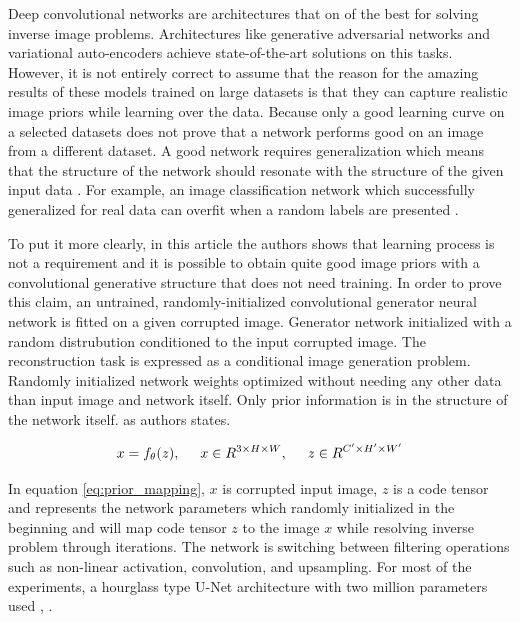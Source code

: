 Deep convolutional networks are architectures that on of the best for solving inverse image problems. Architectures like generative adversarial networks and variational auto-encoders achieve state-of-the-art solutions on this tasks. However, it is not entirely correct to assume that the reason for the amazing results of these models trained on large datasets is that they can capture realistic image priors while learning over the data. Because only a good learning curve on a selected datasets does not prove that a network performs good on an image from a different dataset. A good network requires generalization which means that the structure of the network should resonate with the structure of the given input data \cite{deep_image_prior}. For example, an image classification network which successfully generalized for real data can overfit when a random labels are presented \cite{understanding_deeplearning}.

To put it more clearly, in this article the authors shows that learning process is not a requirement and it is possible to obtain quite good image priors with a convolutional generative structure that does not need training. In order to prove this claim, an untrained, randomly-initialized convolutional generator neural network is fitted on a given corrupted image. Generator network initialized with a random distrubution conditioned to the input corrupted image. The reconstruction task is expressed as a conditional image generation problem. Randomly initialized network weights optimized without needing any other data than input image and network itself. Only prior information is in the structure of the network itself. \cite{deep_image_prior} as authors states.

\begin{equation}
    x = f_{\theta}(z), \hspace{5mm} x \in R^{3\times H \times W}, \hspace{5mm} z \in R^{C'\times H' \times W'}
    \label{eq:prior_mapping}
\end{equation}

In equation \ref{eq:prior_mapping}, \(x\) is corrupted input image, \(z\) is a code tensor and  represents the network parameters which randomly initialized in the beginning and will map code tensor \(z\) to the image \(x\) while resolving inverse problem through iterations. The network is switching between filtering operations such as non-linear activation, convolution, and upsampling. For most of the experiments, a hourglass type U-Net architecture with two million parameters used \cite{deep_image_prior}, \cite{hourglass}.

